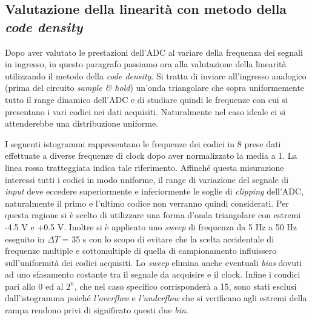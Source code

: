 \documentclass[journal]{IEEEtran}
\begin{document}

\subsection{Valutazione della linearità con metodo della \textit{code density}}
Dopo aver valutato le prestazioni dell'ADC al variare della frequenza dei segnali in ingresso, in questo paragrafo passiamo ora alla valutazione della linearità utilizzando il metodo della \textit{code density}. Si tratta di inviare all'ingresso analogico (prima del circuito \textit{sample \& hold}) un'onda triangolare che sopra uniformemente tutto il range dinamico dell'ADC e di studiare quindi le frequenze con cui si presentano i vari codici nei dati acquisiti. Naturalmente nel caso ideale ci si attenderebbe una distribuzione uniforme.

I seguenti istogrammi rappresentano le frequenze dei codici in 8 prese dati effettuate a diverse frequenze di clock dopo aver normalizzato la media a 1. La linea rossa tratteggiata indica tale riferimento.
Affinché questa misurazione interessi tutti i codici in modo uniforme, il range di variazione del segnale di \textit{input} deve eccedere superiormente e inferiormente le soglie di \textit{clipping} dell'ADC, naturalmente il primo e l'ultimo codice non verranno quindi considerati. Per questa ragione si è scelto di utilizzare una forma d'onda triangolare con estremi -4.5 V e +0.5 V. Inoltre si è applicato uno \textit{sweep} di frequenza da 5 Hz a 50 Hz eseguito in $\Delta T$ = 35 s
con lo scopo di evitare che la scelta accidentale di frequenze multiple e sottomultiple di quella di campionamento influissero sull'uniformità dei codici acquisiti. Lo \textit{sweep} elimina anche eventuali \textit{bias} dovuti ad uno sfasamento costante tra il segnale da acquisire e il clock.
Infine i condici pari allo 0 ed al $2^n$, che nel caso specifico corrisponderà a 15, sono stati esclusi dall'istogramma poiché \textit{l'overflow} e \textit{l'underflow} che si verificano agli estremi della rampa rendono privi di significato questi due \textit{bin}.
\end{document}
